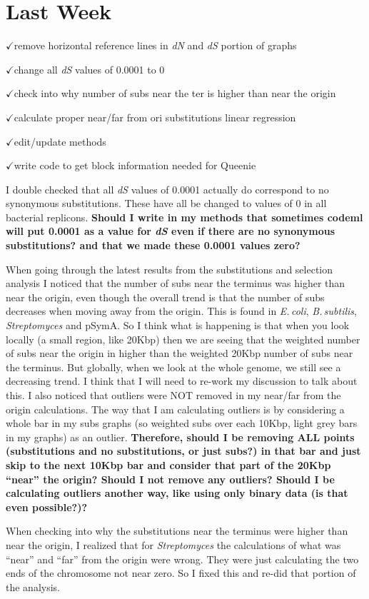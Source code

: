 \documentclass[12pt]{article}
\newcommand{\strep}{\textit{Streptomyces}\xspace}
\newcommand{\bass}{\textit{B.\,subtilis}\xspace}
\newcommand{\ecol}{\textit{E.\,coli}\xspace}
\newcommand{\pa}{pSymA\xspace}
\newcommand{\ch}{$\checkmark$}
\newcommand{\dn}{\textit{dN}\xspace}
\newcommand{\ds}{\textit{dS}\xspace}
\begin{document}
	
\section*{Last Week}

\ch remove horizontal reference lines in \dn and \ds portion of graphs

\ch change all \ds values of 0.0001 to 0

\ch check into why number of subs near the ter is higher than near the origin

\ch calculate proper near/far from ori substitutions linear regression 

\ch edit/update methods

\ch write code to get block information needed for Queenie

I double checked that all \ds values of 0.0001 actually do correspond to no synonymous substitutions.
These have all be changed to values of 0 in all bacterial replicons.
\textbf{Should I write in my methods that sometimes codeml will put 0.0001 as a value for \ds even if there are no synonymous substitutions? and that we made these 0.0001 values zero?}

When going through the latest results from the substitutions and selection analysis I noticed that the number of subs near the terminus was higher than near the origin, even though the overall trend is that the number of subs decreases when moving away from the origin.
This is found in \ecol, \bass, \strep and \pa.
So I think what is happening is that when you look locally (a small region, like 20Kbp) then we are seeing that the weighted number of subs near the origin in higher than the weighted 20Kbp number of subs near the terminus. But globally, when we look at the whole genome, we still see a decreasing trend.
I think that I will need to re-work my discussion to talk about this.
I also noticed that outliers were NOT removed in my near/far from the origin calculations.
The way that I am calculating outliers is by considering a whole bar in my subs graphs (so weighted subs over each 10Kbp, light grey bars in my graphs) as an outlier.
\textbf{Therefore, should I be removing ALL points (substitutions and no substitutions, or just subs?) in that bar and just skip to the next 10Kbp bar and consider that part of the 20Kbp ``near'' the origin? Should I not remove any outliers? Should I be calculating outliers another way, like using only binary data (is that even possible?)?}

When checking into why the substitutions near the terminus were higher than near the origin, I realized that for \strep the calculations of what was ``near'' and ``far'' from the origin were wrong.
They were just calculating the two ends of the chromosome not near zero.
So I fixed this and re-did that portion of the analysis.
\end{document}
